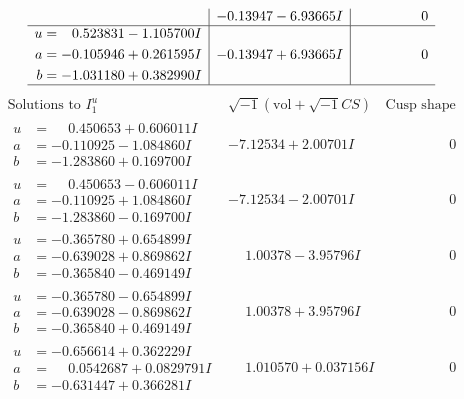 \documentclass[1p]{elsarticle_modified}
\theoremstyle{definition}
\newcommand{\I}{\sqrt{-1}}
\begin{document}
$$\begin{array}{c|c|c}
 & -0.13947 - 6.93665 I & \phantom{-0.000000 } 0 \\ \hline\begin{aligned}
u &= \phantom{-}0.523831 - 1.105700 I \\
a &= -0.105946 + 0.261595 I \\
b &= -1.031180 + 0.382990 I\end{aligned}
 & -0.13947 + 6.93665 I & \phantom{-0.000000 } 0\\
 \hline 
 \end{array}$$\newpage$$\begin{array}{c|c|c}  
\text{Solutions to }I^u_{1}& \I (\text{vol} + \sqrt{-1}CS) & \text{Cusp shape}\\
 \hline 
\begin{aligned}
u &= \phantom{-}0.450653 + 0.606011 I \\
a &= -0.110925 - 1.084860 I \\
b &= -1.283860 + 0.169700 I\end{aligned}
 & -7.12534 + 2.00701 I & \phantom{-0.000000 } 0 \\ \hline\begin{aligned}
u &= \phantom{-}0.450653 - 0.606011 I \\
a &= -0.110925 + 1.084860 I \\
b &= -1.283860 - 0.169700 I\end{aligned}
 & -7.12534 - 2.00701 I & \phantom{-0.000000 } 0 \\ \hline\begin{aligned}
u &= -0.365780 + 0.654899 I \\
a &= -0.639028 + 0.869862 I \\
b &= -0.365840 - 0.469149 I\end{aligned}
 & \phantom{-}1.00378 - 3.95796 I & \phantom{-0.000000 } 0 \\ \hline\begin{aligned}
u &= -0.365780 - 0.654899 I \\
a &= -0.639028 - 0.869862 I \\
b &= -0.365840 + 0.469149 I\end{aligned}
 & \phantom{-}1.00378 + 3.95796 I & \phantom{-0.000000 } 0 \\ \hline\begin{aligned}
u &= -0.656614 + 0.362229 I \\
a &= \phantom{-}0.0542687 + 0.0829791 I \\
b &= -0.631447 + 0.366281 I\end{aligned}
 & \phantom{-}1.010570 + 0.037156 I & \phantom{-0.000000 } 0 \\ \hline\begin{aligned}

\end{aligned}
\end{array}$$
\end{document}
